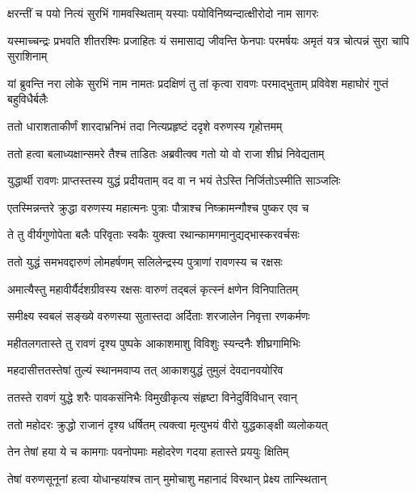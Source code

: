 \twolineshloka
{क्षरन्तीं च पयो नित्यं सुरभिं गामवस्थिताम्}
{यस्याः पयोविनिष्यन्दात्क्षीरोदो नाम सागरः} %

\threelineshloka
{यस्माच्चन्द्रः प्रभवति शीतरश्मिः प्रजाहितः}
{यं समासाद्य जीवन्ति फेनपाः परमर्षयः}
{अमृतं यत्र चोत्पन्नं सुरा चापि सुराशिनाम्} %

\threelineshloka
{यां ब्रुवन्ति नरा लोके सुरभिं नाम नामतः}
{प्रदक्षिणं तु तां कृत्वा रावणः परमाद्भुताम्}
{प्रविवेश महाघोरं गुप्तं बहुविधैर्बलैः} %

\twolineshloka
{ततो धाराशताकीर्णं शारदाभ्रनिभं तदा}
{नित्यप्रहृष्टं ददृशे वरुणस्य गृहोत्तमम्} %

\twolineshloka
{ततो हत्वा बलाध्यक्षान्समरे तैश्च ताडितः}
{अब्रवीत्क्व गतो यो वो राजा शीघ्रं निवेद्यताम्} %

\twolineshloka
{युद्धार्थी रावणः प्राप्तस्तस्य युद्धं प्रदीयताम्}
{वद वा न भयं तेऽस्ति निर्जितोऽस्मीति साञ्जलिः} %

\twolineshloka
{एतस्मिन्नन्तरे क्रुद्धा वरुणस्य महात्मनः}
{पुत्राः पौत्राश्च निष्क्रामन्गौश्च पुष्कर एव च} %

\twolineshloka
{ते तु वीर्यगुणोपेता बलैः परिवृताः स्वकैः}
{युक्त्वा रथान्कामगमानुद्यद्भास्करवर्चसः} %

\twolineshloka
{ततो युद्धं समभवद्दारुणं लोमहर्षणम्}
{सलिलेन्द्रस्य पुत्राणां रावणस्य च रक्षसः} %

\twolineshloka
{अमात्यैस्तु महावीर्यैर्दशग्रीवस्य रक्षसः}
{वारुणं तद्बलं कृत्स्नं क्षणेन विनिपातितम्} %

\twolineshloka
{समीक्ष्य स्वबलं सङ्ख्ये वरुणस्या सुतास्तदा}
{अर्दिताः शरजालेन निवृत्ता रणकर्मणः} %

\twolineshloka
{महीतलगतास्ते तु रावणं दृश्य पुष्पके}
{आकाशमाशु विविशुः स्यन्दनैः शीघ्रगामिभिः} %

\twolineshloka
{महदासीत्ततस्तेषां तुल्यं स्थानमवाप्य तत्}
{आकाशयुद्धं तुमुलं देवदानवयोरिव} %

\twolineshloka
{ततस्ते रावणं युद्धे शरैः पावकसंनिभैः}
{विमुखीकृत्य संहृष्टा विनेदुर्विविधान् रवान्} %

\twolineshloka
{ततो महोदरः क्रुद्धो राजानं दृश्य धर्षितम्}
{त्यक्त्वा मृत्युभयं वीरो युद्धकाङ्क्षी व्यलोकयत्} %

\twolineshloka
{तेन तेषां हया ये च कामगाः पवनोपमाः}
{महोदरेण गदया हतास्ते प्रययुः क्षितिम्} %

\twolineshloka
{तेषां वरुणसूनूनां हत्वा योधान्हयांश्च तान्}
{मुमोचाशु महानादं विरथान् प्रेक्ष्य तान्स्थितान्} %

